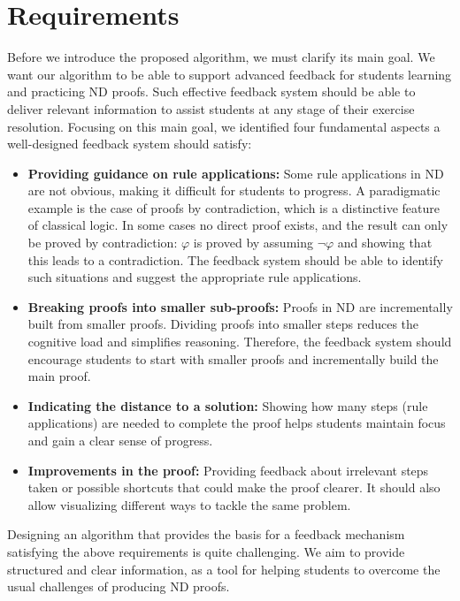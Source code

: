 \section{Requirements}
Before we introduce the proposed algorithm, we must clarify its main goal. We want our algorithm to be able to support advanced feedback for students learning and practicing ND proofs. Such effective feedback system should be able to deliver relevant information to assist students at any stage of their exercise resolution. Focusing on this main goal, we identified four fundamental aspects a well-designed feedback system should satisfy:

\begin{itemize}

\item \textbf {Providing guidance on rule applications:} Some rule applications in ND are not obvious, making it difficult for students to progress. A paradigmatic example is the case of proofs by contradiction, which is a distinctive feature of classical logic. In some cases no direct proof exists, and the result can only be proved by contradiction: \(\varphi\) is proved by assuming \(\neg \varphi\) and showing that this leads to a contradiction. The feedback system should be able to identify such situations and suggest the appropriate rule applications.

\item \textbf {Breaking proofs into smaller sub-proofs:} Proofs in ND are incrementally built from smaller proofs. Dividing proofs into smaller steps reduces the cognitive load and simplifies reasoning. Therefore, the feedback system should encourage students to start with smaller proofs and incrementally build the main proof. 

\item \textbf{Indicating the distance to a solution:} Showing how many steps (rule applications) are needed to complete the proof helps students maintain focus and gain a clear sense of progress.

\item \textbf{Improvements in the proof:} Providing feedback about irrelevant steps taken or possible shortcuts that could make the proof clearer. It should also allow visualizing different ways to tackle the same problem.

\end{itemize}
Designing an algorithm that provides the basis for a feedback mechanism satisfying the above requirements is quite challenging. We aim to provide structured and clear information, as a tool for helping students to overcome the usual challenges of producing ND proofs.